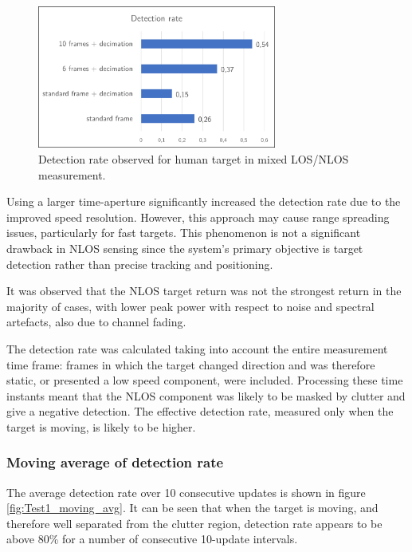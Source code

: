 \begin{figure}[H]
	\centering
	\includegraphics[width=0.7\textwidth]{Images/Test1/detect_hist.png}
	\caption{Detection rate observed for human target in mixed LOS/NLOS measurement.}
	\label{fig:Test1_detect_hist}
\end{figure}

Using a larger time-aperture significantly increased the detection rate due to the improved speed resolution. However, this approach may cause range spreading issues, particularly for fast targets. This phenomenon is not a significant drawback in NLOS sensing since the system's primary objective is target detection rather than precise tracking and positioning.

It was observed that the NLOS target return was not the strongest return in the majority of cases, with lower peak power with respect to noise and spectral artefacts, also due to channel fading.

The detection rate was calculated taking into account the entire measurement time frame: frames in which the target changed direction and was therefore static, or presented a low speed component, were included. Processing these time instants meant that the NLOS component was likely to be masked by clutter and give a negative detection. The effective detection rate, measured only when the target is moving, is likely to be higher.

\subsubsection{Moving average of detection rate}


The average detection rate over 10 consecutive updates is shown in figure \ref{fig:Test1_moving_avg}. It can be seen that when the target is moving, and therefore  well separated from the clutter region, detection rate appears to be above 80\% for a number of consecutive 10-update intervals.

